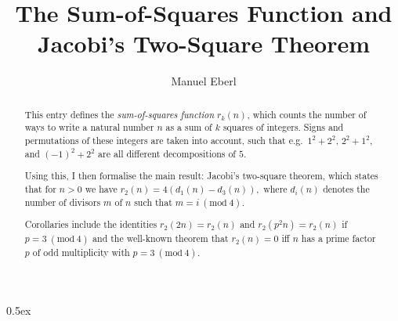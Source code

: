 \documentclass[11pt,a4paper]{article}
\begin{document}
\title{The Sum-of-Squares Function and Jacobi's Two-Square Theorem}
\author{Manuel Eberl}
\maketitle

\begin{abstract}
This entry defines the \emph{sum-of-squares function} $r_k(n)$, which counts the number of
ways to write a natural number $n$ as a sum of $k$ squares of integers. Signs and permutations of 
these integers are taken into account, such that e.g.\ $1^2+2^2$, $2^2+1^2$, and $(-1)^2+2^2$
are all different decompositions of $5$.

Using this, I then formalise the main result: Jacobi's two-square theorem, which states that for $n > 0$
we have $r_2(n) = 4(d_1(n) - d_3(n)),$ where $d_i(n)$ denotes the number of divisors $m$ of $n$
such that $m = i\ (\text{mod}\ 4)$.

Corollaries include the identities $r_2(2n) = r_2(n)$ and $r_2(p^2n) = r_2(n)$ if
$p = 3\ (\text{mod}\ 4)$ and the well-known theorem that $r_2(n) = 0$ iff $n$ has a prime
factor $p$ of odd multiplicity with $p = 3\ (\text{mod}\ 4)$.
\end{abstract}

\tableofcontents

\newpage
\parindent 0pt\parskip 0.5ex



\raggedright
\nocite{grosswald2012}


\end{document}
